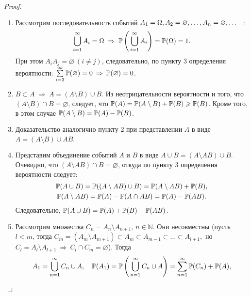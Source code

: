 \begin{proof}\leavevmode
    \begin{enumerate}
    \item 
        Рассмотрим последовательность событий $A_{1} = \Omega, A_{2} = \varnothing, \ldots, \\ 
        A_{n} = \varnothing, \ldots$ \, :
        \begin{equation*}
            \bigcup\limits_{i=1}^\infty A_i = \Omega \; \Rightarrow \; \mathbb{P} \left(\, \bigcup\limits_{i=1}^\infty A_i \right) = {\mathbb{P}(\Omega)} = 1.
        \end{equation*}
        При этом $A_{i}A_j = \varnothing~(i \ne j)$, следовательно, по пункту 3 определения вероятности: $\sum\limits_{i=2}^\infty {\mathbb{P}(\varnothing)} = 0 \: \Rightarrow \: {\mathbb{P}(\varnothing)} = 0$.
    \item 
        $B \subset A \; \Rightarrow \; A = (A \setminus B) \cup B$. 
        Из неотрицательности вероятности и того, что $(A \setminus B) \cap B = \varnothing$, следует, что ${\mathbb{P}(A)} = {\mathbb{P}(A \setminus B)} + {\mathbb{P}(B)} \geqslant {\mathbb{P}(B)}$. 
        Кроме того, в этом случае ${\mathbb{P}(A \setminus B)} = {\mathbb{P}(A)} - {\mathbb{P}(B)}$.
    \item 
        Доказательство аналогично пункту 2 при представлении $A$ в виде \\
        $A = (A \setminus B) \cup AB$.
    \item 
        Представим объединение событий $A$ и $B$ в виде $A \cup B = (A \setminus AB) \cup B$. 
        Очевидно, что $(A \setminus AB) \cap B = \varnothing$, откуда по пункту 3 определения вероятности следует:
        \begin{gather*}
            {\mathbb{P}(A \cup B)} = {\mathbb{P}((A \setminus AB) \cup B)} = {\mathbb{P}(A \setminus AB)} + {\mathbb{P}(B)}, \\
            {\mathbb{P}(A \setminus AB)} = {\mathbb{P}(A)} - {\mathbb{P}(A \cap AB)} = {\mathbb{P}(A)} - {\mathbb{P}(AB)}.
        \end{gather*}
        Следовательно, ${\mathbb{P}(A \cup B)} = {\mathbb{P}(A)} + {\mathbb{P}(B)} - {\mathbb{P}(AB)}$.
    \item 
        Рассмотрим множества $C_n = A_n \setminus A_{n+1}, \, n \in \mathbb{N}$. 
        Они несовместны (пусть $l < m$, тогда $C_m = (A_m \setminus A_{m+1}) \subset A_m \subset A_{m-1} \subset \ldots \subset A_{l+1},$ но $C_l = A_l \setminus A_{l+1} \: \Rightarrow \: C_l \cap C_m = \varnothing$). 
        Тогда
        \begin{gather*}
            A_1 = \bigcup\limits_{n = 1}^{\infty} C_n \cup A, \quad \myprob{A_1} = \mathbb{P}\left(\, \bigcup\limits_{n = 1}^{\infty} C_n \cup A \right) = \sum\limits_{n=1}^{\infty} \myprob{C_n} + \myprob{A}, \\

\end{gather*}
\end{enumerate}
\end{proof}
